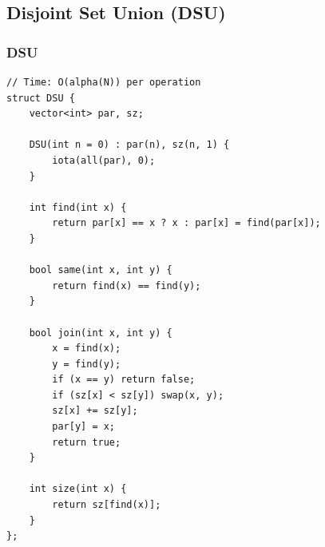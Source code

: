 \documentclass[9pt,a4paper,twocolumn]{extarticle}
\begin{document}
\subsection{Disjoint Set Union (DSU)}

\filbreak
\subsubsection{DSU}
\nopagebreak
\begin{lstlisting}
// Time: O(alpha(N)) per operation
struct DSU {
    vector<int> par, sz;

    DSU(int n = 0) : par(n), sz(n, 1) {
        iota(all(par), 0);
    }

    int find(int x) {
        return par[x] == x ? x : par[x] = find(par[x]);
    }

    bool same(int x, int y) {
        return find(x) == find(y);
    }

    bool join(int x, int y) {
        x = find(x);
        y = find(y);
        if (x == y) return false;
        if (sz[x] < sz[y]) swap(x, y);
        sz[x] += sz[y];
        par[y] = x;
        return true;
    }

    int size(int x) {
        return sz[find(x)];
    }
};
\end{lstlisting}

\filbreak
\end{document}
